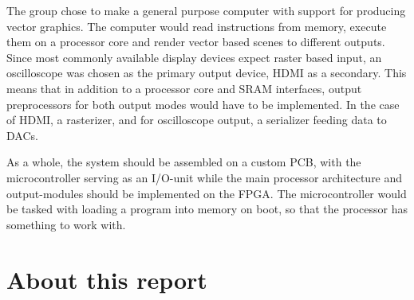 The group chose to make a general purpose computer with support for producing vector graphics.
The computer would read instructions from memory, execute them on a processor core and render vector based scenes to different outputs.
Since most commonly available display devices expect raster based input, an oscilloscope was chosen as the primary output device, HDMI as a secondary.
This means that in addition to a processor core and SRAM interfaces, output preprocessors for both output modes would have to be implemented.
In the case of HDMI, a rasterizer, and for oscilloscope output, a serializer feeding data to DACs.

As a whole, the system should be assembled on a custom PCB, with the microcontroller serving as an I/O-unit while the main processor architecture and output-modules should be implemented on the FPGA.
The microcontroller would be tasked with loading a program into memory on boot, so that the processor has something to work with.


\section{About this report}


